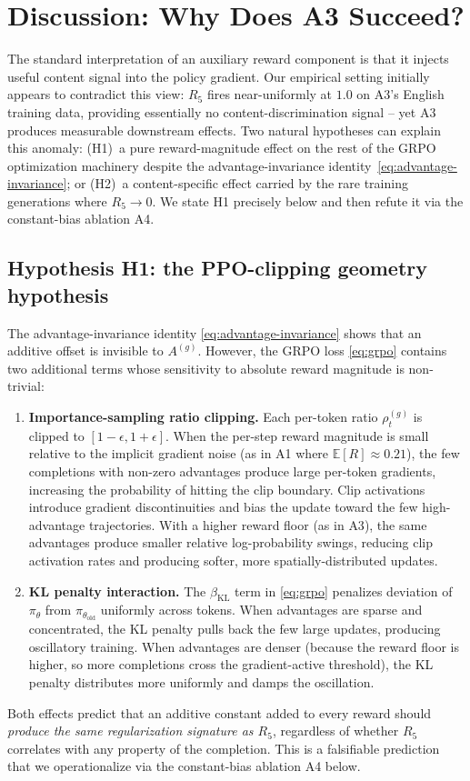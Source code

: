 \documentclass[journal,onecolumn,11pt]{IEEEtran}
\newcommand{\armA}{\textsc{A1}}
\newcommand{\armC}{\textsc{A3}}
\newcommand{\armD}{\textsc{A4}}
\newcommand{\R}[1]{R_{#1}}
\newcommand{\E}{\mathbb{E}}
\begin{document}
\section{Discussion: Why Does \armC{} Succeed?}
\label{sec:mechanism}

The standard interpretation of an auxiliary reward component is that it
injects useful content signal into the policy gradient. Our empirical
setting initially appears to contradict this view: $\R{5}$ fires
near-uniformly at $1.0$ on \armC{}'s English training data, providing
essentially no content-discrimination signal -- yet \armC{} produces
measurable downstream effects. Two natural hypotheses can explain this
anomaly: (H1)~a pure reward-magnitude effect on the rest of the GRPO
optimization machinery despite the advantage-invariance
identity~\eqref{eq:advantage-invariance}; or (H2)~a content-specific
effect carried by the rare training generations where $\R{5}\to 0$. We
state H1 precisely below and then refute it via the constant-bias
ablation \armD{}.

\subsection{Hypothesis H1: the PPO-clipping geometry hypothesis}
The advantage-invariance identity \eqref{eq:advantage-invariance} shows that
an additive offset is invisible to $A^{(g)}$. However, the GRPO loss
\eqref{eq:grpo} contains two additional terms whose sensitivity to absolute
reward magnitude is non-trivial:
\begin{enumerate}
\item \textbf{Importance-sampling ratio clipping.} Each per-token ratio
$\rho_t^{(g)}$ is clipped to $[1-\epsilon, 1+\epsilon]$. When the per-step
reward magnitude is small relative to the implicit gradient noise (as in
\armA{} where $\E[R]\approx 0.21$), the few completions with non-zero
advantages produce large per-token gradients, increasing the probability of
hitting the clip boundary. Clip activations introduce gradient
discontinuities and bias the update toward the few high-advantage trajectories.
With a higher reward floor (as in \armC{}), the same advantages produce
smaller relative log-probability swings, reducing clip activation rates and
producing softer, more spatially-distributed updates.
\item \textbf{KL penalty interaction.} The $\beta_{\text{KL}}$ term in
\eqref{eq:grpo} penalizes deviation of $\pi_\theta$ from
$\pi_{\theta_{\text{old}}}$ uniformly across tokens. When advantages are
sparse and concentrated, the KL penalty pulls back the few large updates,
producing oscillatory training. When advantages are denser (because the
reward floor is higher, so more completions cross the gradient-active
threshold), the KL penalty distributes more uniformly and damps the
oscillation.
\end{enumerate}
Both effects predict that an additive constant added to every reward
should \emph{produce the same regularization signature as $\R{5}$},
regardless of whether $\R{5}$ correlates with any property of the
completion. This is a falsifiable prediction that we operationalize
via the constant-bias ablation \armD{} below.
\end{document}
